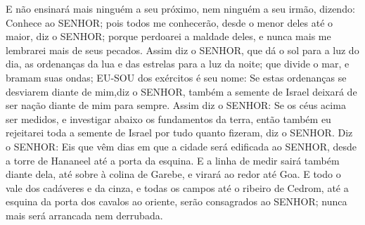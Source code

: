 {E não ensinará mais ninguém a seu próximo, nem ninguém a seu irmão, dizendo: Conhece ao SENHOR; pois todos me conhecerão, desde o menor deles até o maior, diz o SENHOR; porque perdoarei a maldade deles, e nunca mais me lembrarei mais de seus pecados.
Assim diz o SENHOR, que dá o sol para a luz do dia,
{} as ordenanças da lua e das estrelas para a luz da noite; que divide o mar, e bramam suas ondas; EU-SOU dos exércitos é seu nome:
Se estas ordenanças se desviarem diante de mim,diz o SENHOR, também a semente de Israel deixará de ser nação diante de mim para sempre.
Assim diz o SENHOR: Se os céus acima ser medidos, e
{} investigar abaixo os fundamentos da terra, então também eu rejeitarei toda a semente de Israel por tudo quanto fizeram, diz o SENHOR.
Diz o SENHOR: Eis que vêm dias em que a cidade
{} será edificada ao SENHOR, desde a torre de Hananeel até a porta da esquina.
E a linha de medir sairá também diante dela, até sobre à colina de Garebe, e virará ao redor até Goa.
E todo o vale dos cadáveres e da cinza, e todas os campos até o ribeiro de Cedrom, até a esquina da porta dos cavalos ao oriente, serão consagrados ao SENHOR; nunca mais será arrancada nem derrubada.

\par }

